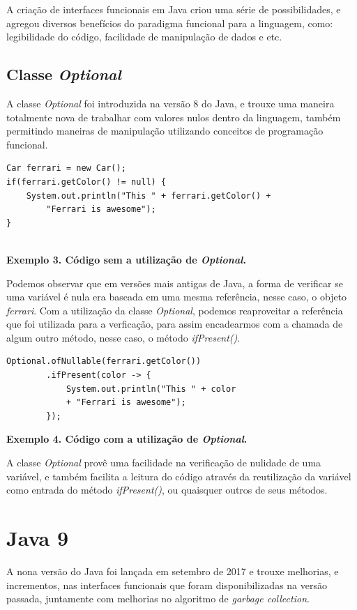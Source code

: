 \documentclass[12pt]{article}
\begin{document}
A criação de interfaces funcionais em Java criou uma série de possibilidades, e agregou diversos benefícios do paradigma funcional para a linguagem, como: legibilidade do código, facilidade de manipulação de dados e etc.

\subsection{Classe \textit{Optional}}

A classe \textit{Optional} foi introduzida na versão 8 do Java, e trouxe uma maneira totalmente nova de trabalhar com valores nulos dentro da linguagem, também permitindo maneiras de manipulação utilizando conceitos de programação funcional.

\begin{verbatim}
Car ferrari = new Car();
if(ferrari.getColor() != null) {
    System.out.println("This " + ferrari.getColor() + 
        "Ferrari is awesome"); 
}
    
\end{verbatim}
\centerline{\textbf{Exemplo 3. Código sem a utilização de \textit{Optional}.}}
\hfill \break

Podemos observar que em versões mais antigas de Java, a forma de verificar se uma variável é nula era baseada em uma mesma referência, nesse caso, o objeto \textit{ferrari}. Com a utilização da classe \textit{Optional}, podemos reaproveitar a referência que foi utilizada para a verficação, para assim encadearmos com a chamada de algum outro método, nesse caso, o método \textit{ifPresent()}.

\begin{verbatim}
Optional.ofNullable(ferrari.getColor())
        .ifPresent(color -> {
            System.out.println("This " + color
            + "Ferrari is awesome");
        });
\end{verbatim}
\centerline{\textbf{Exemplo 4. Código com a utilização de \textit{Optional}.}}

A classe \textit{Optional} provê uma facilidade na verificação de nulidade de uma variável, e também facilita a leitura do código através da reutilização da variável  como entrada do método \textit{ifPresent()}, ou quaisquer outros de seus métodos.


\section{Java 9}

A nona versão do Java foi lançada em setembro de 2017 e trouxe melhorias, e incrementos, nas interfaces funcionais que foram disponibilizadas na versão passada, juntamente com melhorias no algoritmo de \textit{garbage collection}.
\end{document}
